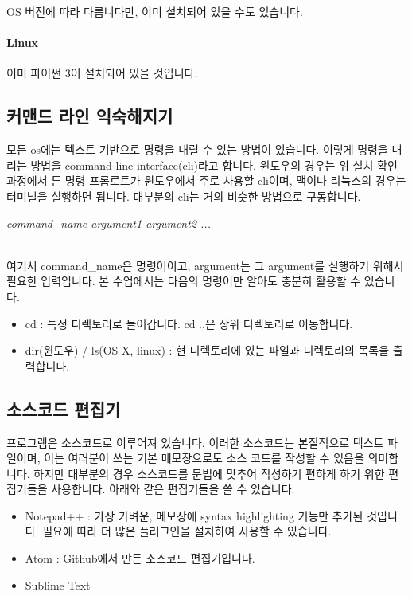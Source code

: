 \documentclass[twoside]{article}
\begin{document}
OS 버전에 따라 다릅니다만, 이미 설치되어 있을 수도 있습니다. 

\paragraph{Linux} 

이미 파이썬 3이 설치되어 있을 것입니다. 

\subsection{커맨드 라인 익숙해지기} 

모든 os에는 텍스트 기반으로 명령을 내릴 수 있는 방법이 있습니다. 이렇게 명령을 내리는 방법을 command line interface(cli)라고 합니다. 윈도우의 경우는 위 설치 확인 과정에서 튼 명령 프롬로트가 윈도우에서 주로 사용할 cli이며, 맥이나 리눅스의 경우는 터미널을 실행하면 됩니다.  대부분의 cli는 거의 비슷한 방법으로 구동합니다. \\

\begin{centering} 
\textit{command\_name argument1 argument2 ... }
\end{centering} \\

여기서 command\_name은 명령어이고, argument는 그 argument를 실행하기 위해서 필요한 입력입니다. 본 수업에서는 다음의 명령어만 알아도 충분히 활용할 수 있습니다. 

\begin{itemize}  
\item cd : 특정 디렉토리로 들어갑니다. cd ..은 상위 디렉토리로 이동합니다. 
\item dir(윈도우) / ls(OS X, linux) : 현 디렉토리에 있는 파일과 디렉토리의 목록을 출력합니다.  
\end{itemize}

\subsection{소스코드 편집기}

프로그램은 소스코드로 이루어져 있습니다. 이러한 소스코드는 본질적으로 텍스트 파일이며, 이는 여러분이 쓰는 기본 메모장으로도 소스 코드를 작성할 수 있음을 의미합니다. 하지만 대부분의 경우 소스코드를 문법에 맞추어 작성하기 편하게 하기 위한 편집기들을 사용합니다. 아래와 같은 편집기들을 쓸 수 있습니다. 

\begin{itemize} 
\item Notepad++ : 가장 가벼운, 메모장에 syntax highlighting 기능만 추가된 것입니다. 필요에 따라 더 많은 플러그인을 설치하여 사용할 수 있습니다. 
\item Atom : Github에서 만든 소스코드 편집기입니다. 
\item Sublime Text 
\end{itemize}
\end{document}
